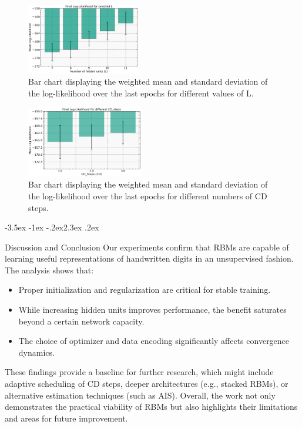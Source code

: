 \documentclass[prl,twocolumn]{revtex4-1}
\makeatletter
\renewcommand{\section}{\@startsection{section}{1}{\z@}%
    {-3.5ex \@plus -1ex \@minus -.2ex}{2.3ex \@plus.2ex}%
    {\normalfont\bfseries\raggedright}}
\makeatother
\begin{document}
\begin{figure}[!tb]
	\includegraphics[width=0.44\textwidth]{L_of_L.jpg}
	\caption{Bar chart displaying the weighted mean and standard deviation of the log-likelihood over the last epochs for different values of L.}
	\label{fig:L_of_L}
\end{figure}

\begin{figure}[!tb]
	\includegraphics[width=0.455\textwidth]{final_L_of_CD.png}
	\caption{Bar chart displaying the weighted mean and standard deviation of the log-likelihood over the last epochs for different numbers of CD steps.}
	\label{fig:final_L_of_CD}
\end{figure}

\section{Discussion and Conclusion}
\label{sec:discussion}
Our experiments confirm that RBMs are capable of learning useful representations of handwritten digits in an unsupervised fashion. The analysis shows that:
\begin{itemize}
	\item Proper initialization and regularization are critical for stable training.
	\item While increasing hidden units improves performance, the benefit saturates beyond a certain network capacity.
	\item The choice of optimizer and data encoding significantly affects convergence dynamics.
\end{itemize}
These findings provide a baseline for further research, which might include adaptive scheduling of CD steps, deeper architectures (e.g., stacked RBMs), or alternative estimation techniques (such as AIS). Overall, the work not only demonstrates the practical viability of RBMs but also highlights their limitations and areas for future improvement.
\end{document}
